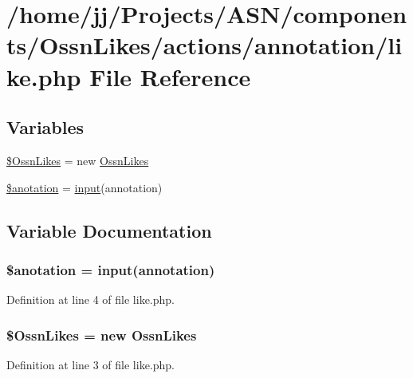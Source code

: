 \hypertarget{annotation_2like_8php}{}\section{/home/jj/\+Projects/\+A\+S\+N/components/\+Ossn\+Likes/actions/annotation/like.php File Reference}
\label{annotation_2like_8php}
\subsection*{Variables}
\begin{DoxyCompactItemize}
\item 
\hyperlink{annotation_2like_8php_a227f36ff099a95468945a2fabc5c0782}{\$\+Ossn\+Likes} = new \hyperlink{class_ossn_likes}{Ossn\+Likes}
\item 
\hyperlink{annotation_2like_8php_af900958147bf7360167d1927035a1e9a}{\$anotation} = \hyperlink{ossn_8lib_8input_8php_a64ebee98b041c4f75f71ed3cd73cc8ed}{input}(\textquotesingle{}annotation\textquotesingle{})
\end{DoxyCompactItemize}


\subsection{Variable Documentation}
\subsubsection[{\texorpdfstring{\$anotation}{$anotation}}]{\setlength{\rightskip}{0pt plus 5cm}\$anotation = {\bf input}(\textquotesingle{}annotation\textquotesingle{})}\hypertarget{annotation_2like_8php_af900958147bf7360167d1927035a1e9a}{}\label{annotation_2like_8php_af900958147bf7360167d1927035a1e9a}


Definition at line 4 of file like.\+php.

\subsubsection[{\texorpdfstring{\$\+Ossn\+Likes}{$OssnLikes}}]{\setlength{\rightskip}{0pt plus 5cm}\${\bf Ossn\+Likes} = new {\bf Ossn\+Likes}}\hypertarget{annotation_2like_8php_a227f36ff099a95468945a2fabc5c0782}{}\label{annotation_2like_8php_a227f36ff099a95468945a2fabc5c0782}


Definition at line 3 of file like.\+php.

